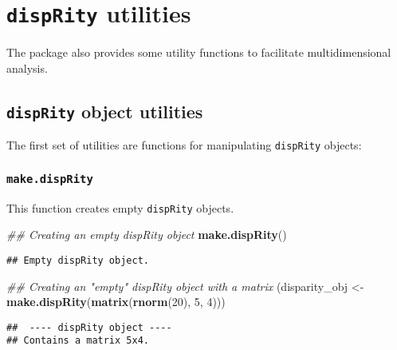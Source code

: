 \documentclass[
]{book}
\newenvironment{Shaded}{\begin{snugshade}}{\end{snugshade}}
\newcommand{\CommentTok}[1]{\textcolor[rgb]{0.56,0.35,0.01}{\textit{#1}}}
\newcommand{\DecValTok}[1]{\textcolor[rgb]{0.00,0.00,0.81}{#1}}
\newcommand{\KeywordTok}[1]{\textcolor[rgb]{0.13,0.29,0.53}{\textbf{#1}}}
\newcommand{\NormalTok}[1]{#1}
\newcommand{\StringTok}[1]{\textcolor[rgb]{0.31,0.60,0.02}{#1}}
\begin{document}
\hypertarget{utilities}{%
\section{\texorpdfstring{\texttt{dispRity} utilities}{dispRity utilities}}\label{utilities}}

The package also provides some utility functions to facilitate multidimensional analysis.

\hypertarget{disprity-object-utilities}{%
\subsection{\texorpdfstring{\texttt{dispRity} object utilities }{dispRity object utilities }}\label{disprity-object-utilities}}

The first set of utilities are functions for manipulating \texttt{dispRity} objects:

\hypertarget{make.disprity}{%
\subsubsection{\texorpdfstring{\texttt{make.dispRity}}{make.dispRity}}\label{make.disprity}}

This function creates empty \texttt{dispRity} objects.

\begin{Shaded}
\begin{Highlighting}[]
\CommentTok{\#\# Creating an empty dispRity object}
\KeywordTok{make.dispRity}\NormalTok{()}
\end{Highlighting}
\end{Shaded}

\begin{verbatim}
## Empty dispRity object.
\end{verbatim}

\begin{Shaded}
\begin{Highlighting}[]
\CommentTok{\#\# Creating an "empty" dispRity object with a matrix}
\NormalTok{(disparity\_obj \textless{}{-}}\StringTok{ }\KeywordTok{make.dispRity}\NormalTok{(}\KeywordTok{matrix}\NormalTok{(}\KeywordTok{rnorm}\NormalTok{(}\DecValTok{20}\NormalTok{), }\DecValTok{5}\NormalTok{, }\DecValTok{4}\NormalTok{)))}
\end{Highlighting}
\end{Shaded}

\begin{verbatim}
##  ---- dispRity object ---- 
## Contains a matrix 5x4.
\end{verbatim}
\end{document}
